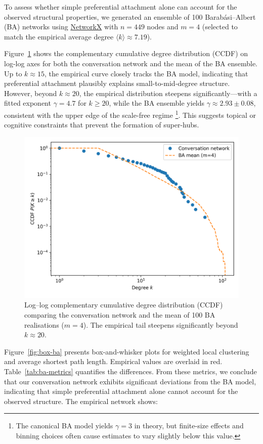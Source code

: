 \documentclass[10pt, a4paper]{article}
\begin{document}
To assess whether simple preferential attachment alone can account for the observed structural properties, we generated an ensemble of 100 Barabási--Albert (BA) networks using \url{NetworkX} with $n=449$ nodes and $m=4$ (selected to match the empirical average degree $\langle k \rangle \approx 7.19$).

Figure~\ref{fig:deg-ccdf} shows the complementary cumulative degree distribution (CCDF) on log-log axes for both the conversation network and the mean of the BA ensemble. Up to $k \approx 15$, the empirical curve closely tracks the BA model, indicating that preferential attachment plausibly explains small-to-mid-degree structure. However, beyond $k \approx 20$, the empirical distribution steepens significantly---with a fitted exponent $\gamma = 4.7$ for $k \ge 20$, while the BA ensemble yields $\gamma \approx 2.93 \pm 0.08$, consistent with the upper edge of the scale-free regime \footnote{The canonical BA model yields $\gamma = 3$ in theory, but finite-size effects and binning choices often cause estimates to vary slightly below this value.}. This suggests topical or cognitive constraints that prevent the formation of super-hubs.

\begin{figure}
  \centering
  \includegraphics[width=0.82\linewidth]{images/degree_overlay.png}
  \caption{Log--log complementary cumulative degree distribution (CCDF) comparing the conversation network and the mean of 100 BA realisations ($m=4$). The empirical tail steepens significantly beyond $k\approx20$.}
  \label{fig:deg-ccdf}
\end{figure}

Figure~\ref{fig:box-ba} presents box-and-whisker plots for weighted local clustering and average shortest path length. Empirical values are overlaid in red. Table~\ref{tab:ba-metrics} quantifies the differences. From these metrics, we conclude that our conversation network exhibits significant deviations from the BA model, indicating that simple preferential attachment alone cannot account for the observed structure. The empirical network shows:
\end{document}
